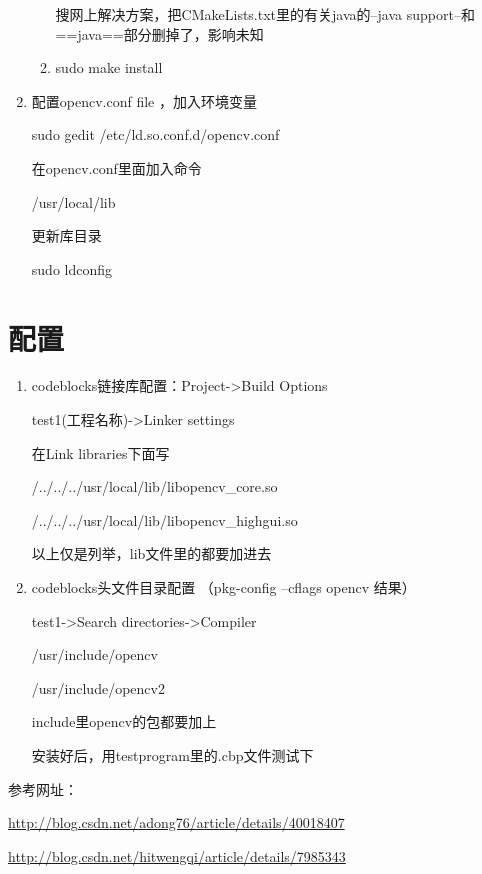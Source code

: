 \documentclass[12pt]{article}
\begin{document}
\begin{enumerate}
\begin{enumerate}
搜网上解决方案，把CMakeLists.txt里的有关java的--java support--和==java==部分删掉了，影响未知

\item sudo make install

\end{enumerate}

\item 配置opencv.conf file ，加入环境变量  

sudo gedit /etc/ld.so.conf.d/opencv.conf

在opencv.conf里面加入命令

/usr/local/lib

更新库目录

sudo ldconfig

\begin{comment}

打开文件bash.bashrc  //这个暂时不知道是干嘛的,我没执行, 程序没影响

sudo gedit /etc/bash.bashrc

加入下面两行

PKG\_CONFIG\_PATH=\$PKG\_CONFIG\_PATH:/usr/local/lib/pkgconfig

export PKG\_CONFIG\_PATH\

\end{comment}

\end{enumerate}

\section{配置}

\begin{enumerate}
\item codeblocks链接库配置：Project->Build Options

test1(工程名称)->Linker settings

在Link libraries下面写

/../../../usr/local/lib/libopencv\_core.so

/../../../usr/local/lib/libopencv\_highgui.so

以上仅是列举，lib文件里的都要加进去

\item codeblocks头文件目录配置 （pkg-config --cflags opencv 结果）

test1->Search directories->Compiler

/usr/include/opencv

/usr/include/opencv2

include里opencv的包都要加上

\begin{comment}

\item CodeBlocks 路文件目录配置

test1->Search directories->Linker

/usr/lib

\end{comment}

安装好后，用testprogram里的.cbp文件测试下

\end{enumerate}

参考网址：

\url{http://blog.csdn.net/adong76/article/details/40018407}
          
\url{http://blog.csdn.net/hitwengqi/article/details/7985343}
\end{document}
